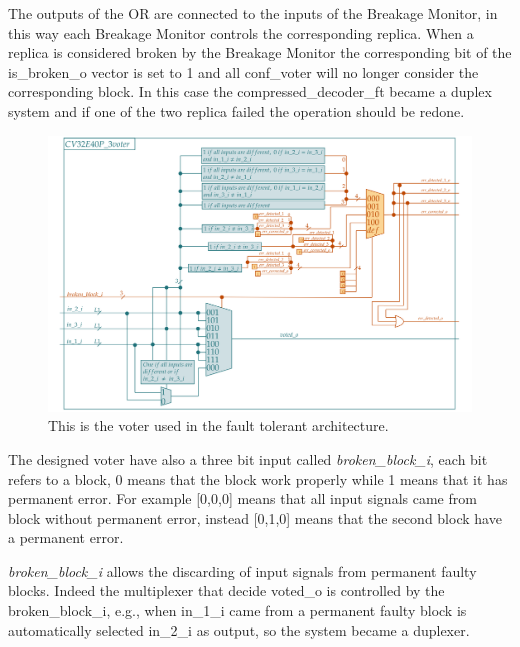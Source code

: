 {        The outputs of the OR are connected to the inputs of the Breakage Monitor, in this way each Breakage Monitor controls the corresponding replica. 
        When a replica is considered broken by the Breakage Monitor the corresponding bit of the is\_broken\_o vector is set to 1 and all conf\_voter will no longer consider the corresponding block. 
        In this case the compressed\_decoder\_ft became a duplex system and if one of the two replica failed the operation should be redone.\\
        
        
	    
	    \begin{figure}[H]
    		\centering
    		\includegraphics[width=1.1\textwidth,center]{./images/cv32e40p_3voter.png}
    		\caption{This is the voter used in the fault tolerant architecture.}
    		\label{fig:cv32e40p_voter}
    	\end{figure} 	
    	
    	The designed voter have also a three bit input called \textit{broken\_block\_i}, each bit refers to a block, 0 means that the block work properly while 1 means that it has permanent error.
        For example [0,0,0] means that all input signals came from block without permanent error, instead [0,1,0] means that the second block have a permanent error.
        
        \textit{broken\_block\_i} allows the discarding of input signals from permanent faulty blocks.
        Indeed the multiplexer that decide voted\_o is controlled by the broken\_block\_i, e.g., when in\_1\_i came from a permanent faulty block is automatically selected in\_2\_i as output, so the system became a duplexer.\\
        
}
